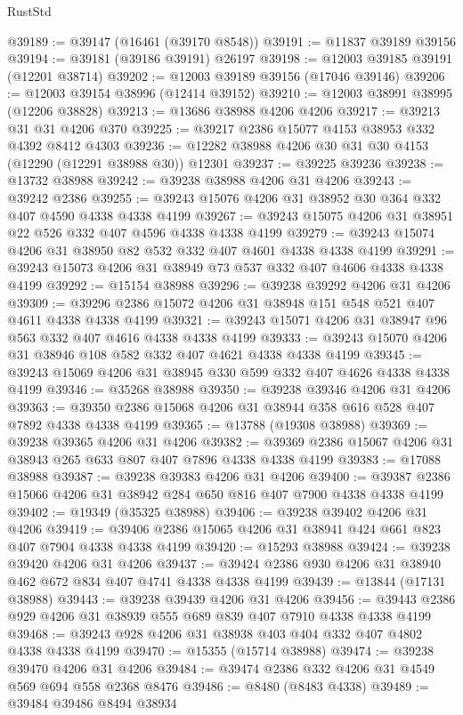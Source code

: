 \begin{lexlean}{RustStd}
\begin{coremodule}
{\begin{coremodule}
{{{{{{{{{{{{{{{{{{{{{{{{{{{{{{{{{{{{{{{{{{{{{{{{{{@39189 := @39147 (@16461 (@39170 @8548))
@39191 := @11837 @39189 @39156
@39194 := @39181 (@39186 @39191) @26197
@39198 := @12003 @39185 @39191 (@12201 @38714)
@39202 := @12003 @39189 @39156 (@17046 @39146)
@39206 := @12003 @39154 @38996 (@12414 @39152)
@39210 := @12003 @38991 @38995 (@12206 @38828)
@39213 := @13686 @38988 @4206 @4206
@39217 := @39213 @31 @31 @4206 @370
@39225 := @39217 @2386 @15077 @4153 @38953 @332 @4392 @8412 @4303
@39236 := @12282 @38988 @4206 @30 @31 @30 @4153 (@12290 (@12291 @38988 @30)) @12301
@39237 := @39225 @39236
@39238 := @13732 @38988
@39242 := @39238 @38988 @4206 @31 @4206
@39243 := @39242 @2386
@39255 := @39243 @15076 @4206 @31 @38952 @30 @364 @332 @407 @4590 @4338 @4338 @4199
@39267 := @39243 @15075 @4206 @31 @38951 @22 @526 @332 @407 @4596 @4338 @4338 @4199
@39279 := @39243 @15074 @4206 @31 @38950 @82 @532 @332 @407 @4601 @4338 @4338 @4199
@39291 := @39243 @15073 @4206 @31 @38949 @73 @537 @332 @407 @4606 @4338 @4338 @4199
@39292 := @15154 @38988
@39296 := @39238 @39292 @4206 @31 @4206
@39309 := @39296 @2386 @15072 @4206 @31 @38948 @151 @548 @521 @407 @4611 @4338 @4338 @4199
@39321 := @39243 @15071 @4206 @31 @38947 @96 @563 @332 @407 @4616 @4338 @4338 @4199
@39333 := @39243 @15070 @4206 @31 @38946 @108 @582 @332 @407 @4621 @4338 @4338 @4199
@39345 := @39243 @15069 @4206 @31 @38945 @330 @599 @332 @407 @4626 @4338 @4338 @4199
@39346 := @35268 @38988
@39350 := @39238 @39346 @4206 @31 @4206
@39363 := @39350 @2386 @15068 @4206 @31 @38944 @358 @616 @528 @407 @7892 @4338 @4338 @4199
@39365 := @13788 (@19308 @38988)
@39369 := @39238 @39365 @4206 @31 @4206
@39382 := @39369 @2386 @15067 @4206 @31 @38943 @265 @633 @807 @407 @7896 @4338 @4338 @4199
@39383 := @17088 @38988
@39387 := @39238 @39383 @4206 @31 @4206
@39400 := @39387 @2386 @15066 @4206 @31 @38942 @284 @650 @816 @407 @7900 @4338 @4338 @4199
@39402 := @19349 (@35325 @38988)
@39406 := @39238 @39402 @4206 @31 @4206
@39419 := @39406 @2386 @15065 @4206 @31 @38941 @424 @661 @823 @407 @7904 @4338 @4338 @4199
@39420 := @15293 @38988
@39424 := @39238 @39420 @4206 @31 @4206
@39437 := @39424 @2386 @930 @4206 @31 @38940 @462 @672 @834 @407 @4741 @4338 @4338 @4199
@39439 := @13844 (@17131 @38988)
@39443 := @39238 @39439 @4206 @31 @4206
@39456 := @39443 @2386 @929 @4206 @31 @38939 @555 @689 @839 @407 @7910 @4338 @4338 @4199
@39468 := @39243 @928 @4206 @31 @38938 @403 @404 @332 @407 @4802 @4338 @4338 @4199
@39470 := @15355 (@15714 @38988)
@39474 := @39238 @39470 @4206 @31 @4206
@39484 := @39474 @2386 @332 @4206 @31 @4549 @569 @694 @558 @2368 @8476
@39486 := @8480 (@8483 @4338)
@39489 := @39484 @39486 @8494 @38934
}}}}}}}}}}}}}}}}}}}}}}}}}}}}}}}}}}}}}}}}}}}}}}}}}}
\end{coremodule}}
\end{coremodule}
\end{lexlean}
